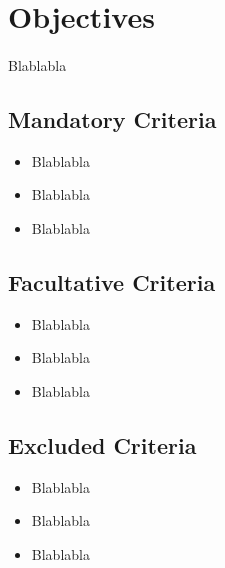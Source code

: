 \section{Objectives}

\paragraph{}Blablabla

\subsection{Mandatory Criteria}

\begin{itemize}
\item Blablabla
\item Blablabla
\item Blablabla
\end{itemize}

\subsection{Facultative Criteria}

\begin{itemize}
\item Blablabla
\item Blablabla
\item Blablabla
\end{itemize}

\subsection{Excluded Criteria}

\begin{itemize}
\item Blablabla
\item Blablabla
\item Blablabla
\end{itemize}
